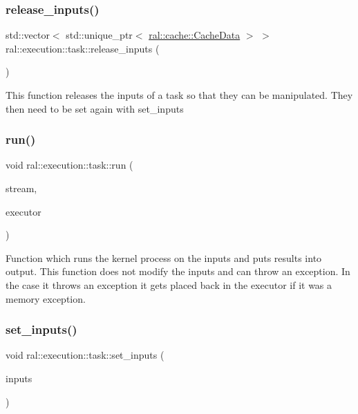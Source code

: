 \subsubsection{\texorpdfstring{release\+\_\+inputs()}{release\_inputs()}}
{\footnotesize\ttfamily std\+::vector$<$ std\+::unique\+\_\+ptr$<$ \hyperlink{classral_1_1cache_1_1CacheData}{ral\+::cache\+::\+Cache\+Data} $>$ $>$ ral\+::execution\+::task\+::release\+\_\+inputs (\begin{DoxyParamCaption}{ }\end{DoxyParamCaption})}

This function releases the inputs of a task so that they can be manipulated. They then need to be set again with set\+\_\+inputs \mbox{\label{classral_1_1execution_1_1task_ad4b6bafee29648cb7893a521342a69ec}} 
\subsubsection{\texorpdfstring{run()}{run()}}
{\footnotesize\ttfamily void ral\+::execution\+::task\+::run (\begin{DoxyParamCaption}\item[{cuda\+Stream\+\_\+t}]{stream,  }\item[{\hyperlink{classral_1_1execution_1_1executor}{executor} $\ast$}]{executor }\end{DoxyParamCaption})}

Function which runs the kernel process on the inputs and puts results into output. This function does not modify the inputs and can throw an exception. In the case it throws an exception it gets placed back in the executor if it was a memory exception. \mbox{\label{classral_1_1execution_1_1task_a9d1c2ebe66d6ada25cc1eccb246774b9}} 
\subsubsection{\texorpdfstring{set\+\_\+inputs()}{set\_inputs()}}
{\footnotesize\ttfamily void ral\+::execution\+::task\+::set\+\_\+inputs (\begin{DoxyParamCaption}\item[{std\+::vector$<$ std\+::unique\+\_\+ptr$<$ \hyperlink{classral_1_1cache_1_1CacheData}{ral\+::cache\+::\+Cache\+Data} $>$ $>$}]{inputs }\end{DoxyParamCaption})}

